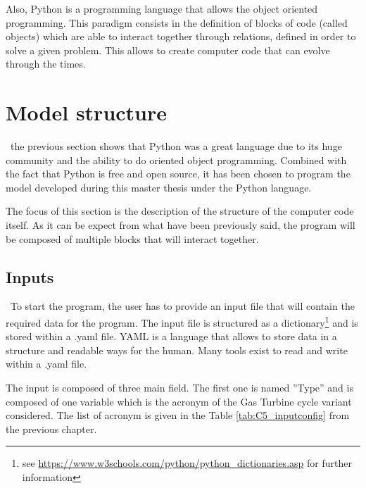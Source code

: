 Also, Python is a programming language that allows the object oriented programming. This paradigm consists in the definition of blocks of code (called objects) which are able to interact together through relations, defined in order to solve a given problem. This allows to create computer code that can evolve through the times. 

\section{Model structure}
\quad\, the previous section shows that Python was a great language due to its huge community and the ability to do oriented object programming. Combined with the fact that Python is free and open source, it has been chosen to program the model developed during this master thesis under the Python language.

The focus of this section is the description of the structure of the computer code itself. As it can be expect from what have been previously said, the program will be composed of multiple blocks that will interact together.

\subsection{Inputs}
\quad\, To start the program, the user has to provide an input file that will contain the required data for the program. The input file is structured as a dictionary\footnote{see \url{https://www.w3schools.com/python/python_dictionaries.asp} for further information} and is stored within a .yaml file. 
YAML is a language that allows to store data in a structure and readable ways for the human. Many tools exist to read and write within a .yaml file.

The input is composed of three main field. The first one is named ''Type'' and is composed of one variable which is the acronym of the Gas Turbine cycle variant considered. The list of acronym is given in the Table \ref{tab:C5_inputconfig} from the previous chapter.

